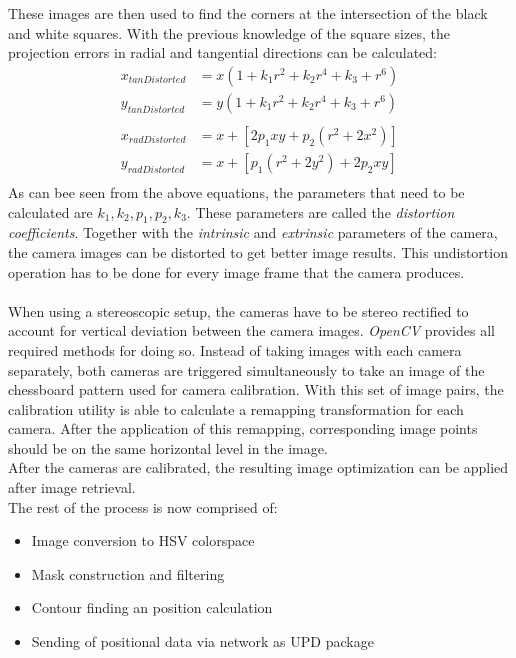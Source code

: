 These images are then used to find the corners at the intersection of the black and white squares. With the previous knowledge of the square sizes, the projection errors in radial and tangential directions can be calculated:
\begin{equation}
\begin{split}
x_{tanDistorted}&=x(1+k_{1}r^{2}+k_{2}r^{4}+k_{3}+r^{6})\\
y_{tanDistorted}&=y(1+k_{1}r^{2}+k_{2}r^{4}+k_{3}+r^{6})\\
\\
x_{radDistorted}&=x+[2p_{1}xy+p_{2}(r^{2}+2x^{2})]\\
y_{radDistorted}&=x+[p_{1}(r^{2}+2y^{2})+2p_{2}xy]\\
\end{split}
\end{equation} 
As can bee seen from the above equations, the parameters that need to be calculated are $k_{1},k_{2},p_{1},p_{2},k_{3}$. These parameters are called the \textit{distortion coefficients}. Together with the \textit{intrinsic} and \textit{extrinsic} parameters of the camera, the camera images can be distorted to get better image results. This undistortion operation has to be done for every image frame that the camera produces.\\\\
When using a stereoscopic setup, the cameras have to be stereo rectified to account for vertical deviation between the camera images. \textit{OpenCV} provides all required methods for doing so. Instead of taking images with each camera separately, both cameras are triggered simultaneously to take an image of the chessboard pattern used for camera calibration. With this set of image pairs, the calibration utility is able to calculate a remapping transformation for each camera. After the application of this remapping, corresponding image points should be on the same horizontal level in the image.\\After the cameras are calibrated, the resulting image optimization can be applied after image retrieval.\\The rest of the process is now comprised of:
\begin{itemize}
\item Image conversion to HSV colorspace
\item Mask construction and filtering
\item Contour finding an position calculation
\item Sending of positional data via network as UPD package
\end{itemize}
